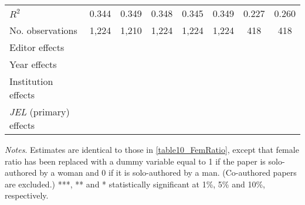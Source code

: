 \begin{table}
\begin{adjustwidth}{-0.085cm}{}
\begin{threeparttable}
\begin{tabular}{p{2.64cm}SSSSSSS}
            \midrule
            \(R^2\)                       &       0.344   &       0.349   &       0.348   &       0.345   &       0.349   &       0.227   &       0.260   \\
            No. observations              &       1,224   &       1,210   &       1,224   &       1,224   &       1,224   &         418   &         418   \\
            \midrule
            Editor effects       &           {}   &           {}   &           {}   &           {}   &           {}   &           {}   &           {}   \\
            Year effects                  &           {}   &           {}   &           {}   &           {}   &           {}   &           {}   &           {}   \\
            Institution effects           &           {}   &           {}   &           {}   &           {}   &           {}   &           {}   &           {}   \\
            \textit{JEL} (primary) effects&               &               &               &               &               &               &           {}   \\
            \bottomrule
        \end{tabular}
        \begin{tablenotes}
            \tiny
            \item \textit{Notes}. Estimates are identical to those in \autoref{table10_FemRatio}, except that female ratio has been replaced with a dummy variable equal to 1 if the paper is solo-authored by a woman and 0 if it is solo-authored by a man. (Co-authored papers are excluded.) ***, ** and * statistically significant at 1\%, 5\% and 10\%, respectively.
        \end{tablenotes}
    \end{threeparttable}
    \end{adjustwidth}
\end{table}
